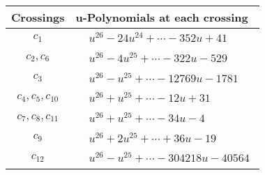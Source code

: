 \documentclass[1p]{elsarticle_modified}
\theoremstyle{definition}
\begin{document}
\begin{tabular}{m{50pt}|m{274pt}}
Crossings & \hspace{64pt}u-Polynomials at each crossing \\
\hline $$\begin{aligned}c_{1}\end{aligned}$$&$\begin{aligned}
&u^{26}-24 u^{24}+\cdots-352 u+41
\end{aligned}$\\
\hline $$\begin{aligned}c_{2},c_{6}\end{aligned}$$&$\begin{aligned}
&u^{26}-4 u^{25}+\cdots-322 u-529
\end{aligned}$\\
\hline $$\begin{aligned}c_{3}\end{aligned}$$&$\begin{aligned}
&u^{26}- u^{25}+\cdots-12769 u-1781
\end{aligned}$\\
\hline $$\begin{aligned}c_{4},c_{5},c_{10}\end{aligned}$$&$\begin{aligned}
&u^{26}+u^{25}+\cdots-12 u+31
\end{aligned}$\\
\hline $$\begin{aligned}c_{7},c_{8},c_{11}\end{aligned}$$&$\begin{aligned}
&u^{26}+u^{25}+\cdots-34 u-4
\end{aligned}$\\
\hline $$\begin{aligned}c_{9}\end{aligned}$$&$\begin{aligned}
&u^{26}+2 u^{25}+\cdots+36 u-19
\end{aligned}$\\
\hline $$\begin{aligned}c_{12}\end{aligned}$$&$\begin{aligned}
&u^{26}- u^{25}+\cdots-304218 u-40564
\end{aligned}$\\
\hline
\end{tabular}\\~\\
\newpage\renewcommand{\arraystretch}{1}
\end{document}
